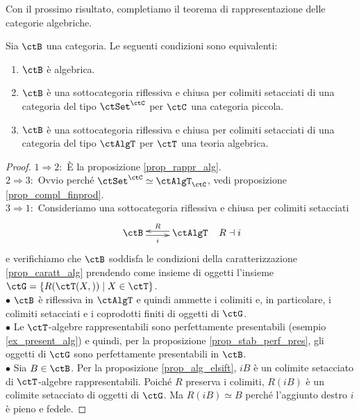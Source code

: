 Con il prossimo risultato, completiamo il teorema di rappresentazione delle categorie algebriche.

\begin{proposition}\label{prop_rappr_alg_vv}
 Sia \(\ctB\) una categoria. Le seguenti condizioni sono equivalenti:
 \begin{enumerate}
  \item \(\ctB\) è algebrica.
  \item \(\ctB\) è una sottocategoria riflessiva e chiusa per colimiti setacciati di una categoria del tipo
        \(\ctSet^{\ctC}\) per \(\ctC\) una categoria piccola.
  \item \(\ctB\) è una sottocategoria riflessiva e chiusa per colimiti setacciati di una categoria del tipo
        \(\ctAlgT\) per \(\ctT\) una teoria algebrica.
 \end{enumerate}
\end{proposition}

\begin{proof}
 \(1 \Rightarrow 2 \colon\) È la proposizione \ref{prop_rappr_alg}. \\
 \(2 \Rightarrow 3 \colon\) Ovvio perché \(\ctSet^{\ctC} \simeq \ctAlgT_{\ctC}\), vedi proposizione \ref{prop_compl_finprod}. \\
 \(3 \Rightarrow 1 \colon\) Consideriamo una sottocategoria riflessiva e chiusa per colimiti setacciati
 \[ \xymatrix{\ctB \ar@<-0.5ex>[r]_-{i} & \ctAlgT \ar@<-0.5ex>[l]_-{R} } \;\;\; R \dashv i \]
 e verifichiamo che \(\ctB\) soddisfa le condizioni della caratterizzazione \ref{prop_caratt_alg} prendendo come insieme di
 oggetti l'insieme \(\ctG = \{R(\ctT(X,)) \mid X \in \ctT\}\). \\
 \(\bullet\) \(\ctB\) è riflessiva in \(\ctAlgT\) e quindi ammette i colimiti e, in particolare, i colimiti setacciati e i coprodotti
 finiti di oggetti di \(\ctG\). \\
 \(\bullet\) Le \(\ctT\)-algebre rappresentabili sono perfettamente presentabili (esempio \ref{ex_present_alg}) e quindi,
 per la proposizione \ref{prop_stab_perf_pres}, gli oggetti di \(\ctG\) sono perfettamente presentabili in \(\ctB\). \\
 \(\bullet\) Sia \(B \in \ctB\). Per la proposizione \ref{prop_alg_elsift}, \(iB\) è un colimite setacciato di \(\ctT\)-algebre
 rappresentabili. Poiché \(R\) preserva i colimiti, \(R(iB)\) è un colimite setacciato di oggetti di \(\ctG\). Ma \(R(iB) \simeq B\)
 perché l'aggiunto destro \(i\) è pieno e fedele.
\end{proof}

